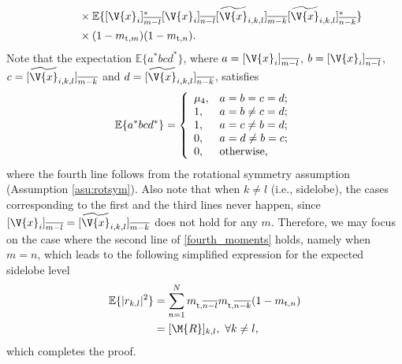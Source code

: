 \documentclass[journal,a4paper,10pt, romanappendices]{IEEEtran}
\begin{document}
\begin{IEEEproof}
$$\begin{aligned}
&\hspace{10mm}\times \mathbb{E}\{[\V{x}_i]^*_{\overline{m-l}}[\V{x}_i]_{\overline{n-l}}[\widetilde{\V{x}}_{i,k,l}]_{\overline{m-k}}[\widetilde{\V{x}}_{i,k,l}]^*_{\overline{n-k}}\}\\
&\hspace{10mm}\times(1-m_{{\rm t},m})(1-m_{{\rm t},n}).
\end{aligned}
$$
Note that the expectation $\mathbb{E}\{a^*bcd^*\}$, where $a=[\V{x}_i]_{\overline{m-l}}$, $b=[\V{x}_i]_{\overline{n-l}}$, $c=[\widetilde{\V{x}}_{i,k,l}]_{\overline{m-k}}$ and $d=[\widetilde{\V{x}}_{i,k,l}]_{\overline{n-k}}$, satisfies
\begin{equation}\label{fourth_moments}
\mathbb{E}\{a^*bcd^*\}=\left\{
  \begin{array}{ll}
    \mu_4, & \hbox{$a=b=c=d$;} \\
    1, & \hbox{$a=b\neq c=d$;}\\
    1, & \hbox{$a=c\neq b=d$;} \\
    0, & \hbox{$a=d\neq b=c$;} \\
    0, & \hbox{otherwise,}
  \end{array}
\right.
\end{equation}
where the fourth line follows from the rotational symmetry assumption (Assumption \ref{asu:rotsym}). Also note that when $k\neq l$ (i.e., sidelobe), the cases corresponding to the first and the third lines never happen, since $[\V{x}_i]_{\overline{m-l}}=[\widetilde{\V{x}}_{i,k,l}]_{\overline{m-k}}$ does not hold for any $m$. Therefore, we may focus on the case where the second line of \eqref{fourth_moments} holds, namely when $m=n$, which leads to the following simplified expression for the expected sidelobe level
\begin{align}\label{esl_pre}
\mathbb{E}\{|r_{k,l}|^2\} &= \sum_{n=1}^N m_{{\rm t},\overline{n-l}} m_{{\rm t},\overline{n-k}} (1-m_{{\rm t},n}) \nonumber\\
&=[\M{R}]_{k,l},~\forall k\neq l,
\end{align}
which completes the proof.
\end{IEEEproof}
\end{document}

